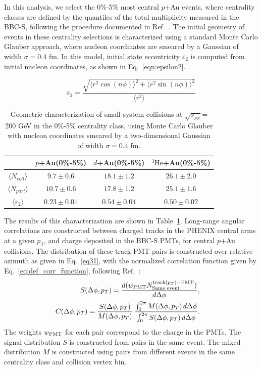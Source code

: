 \documentclass[%
reprint,
showpacs,preprintnumbers,
 amsmath,amssymb,
 aps,
]{revtex4-1}
\newcommand{\pt}{\mbox{$p_T$}\xspace}
\newcommand{\sqsn}{\mbox{$\sqrt{s_{_{NN}}}$}\xspace}
\newcommand{\dau}{\mbox{$d$+Au}\xspace}
\newcommand{\pau}{\mbox{$p$+Au}\xspace}
\newcommand{\hau}{\mbox{$^3\text{He}$+Au}\xspace}
\begin{document}
In this analysis, we select the 0\%-5\% most central \pau events, where 
centrality classes are defined by the quantiles of the total multiplicity measured in the BBC-S, following the procedure documented in Ref.~\cite{bbc}.
The initial geometry of events in these centrality selections is characterized using a standard Monte Carlo Glauber approach, where nucleon coordinates are smeared by a Gaussian of width $\sigma = 0.4$ fm. In this model, initial state eccentricity $\varepsilon_2$ is computed from initial nucleon coordinates, as shown in Eq.~\ref{eqn:epsilon2}. 

\begin{equation}
\label{eqn:epsilon2}
\varepsilon_2 = \frac{\sqrt{\langle r^2\cos (n\phi)\rangle ^2 + \langle r^2\sin (n\phi) \rangle ^2}}{\langle r^2 \rangle}
\end{equation}

\begin{table}
\caption{Geometric characterization of small system collisions at \sqsn = 200 GeV in the 0\%-5\% centrality class, using Monte Carlo Glauber with nucleon coordinates smeared by a two-dimensional Gaussian of width $\sigma=0.4$ fm.}
\begin{ruledtabular}
\begin{tabular}{c c c c}
\label{table_geometry}
 & \pau (0\%-5\%) & \dau (0\%-5\%) & \hau (0\%-5\%) \\
\hline
 $\langle N_{coll} \rangle$ & $9.7\pm 0.6$ & $18.1\pm 1.2$ & $26.1\pm 2.0$ \\
 $\langle N_{part} \rangle$ & $10.7\pm 0.6$ & $17.8\pm 1.2$ & $25.1\pm  1.6$ \\ 
 $\langle \varepsilon_2 \rangle$ & $0.23\pm 0.01$ & $0.54\pm 0.04$ & $0.50\pm 0.02$
\end{tabular}
\end{ruledtabular}
\end{table}

The results of this characterization are shown in Table~\ref{table_geometry}. Long-range angular correlations are constructed between charged tracks in the PHENIX central arms at a given \pt, and charge deposited in the BBC-S PMTs, for central \pau collisions. The distribution of these track-PMT pairs is constructed over relative azimuth as given in Eq.~\ref{eq31}, with the normalized correlation function given by Eq.~\ref{eq:def_corr_function}, following Ref.~\cite{PhysRevLett.115.142301}:
\begin{eqnarray}
  S(\Delta\phi,p_{T})=
  \frac{ d(w_{{\rm PMT}} N^{{\rm track}(p_{T}){\rm - PMT}}_{{\rm Same \; event}}) }{ d\Delta\phi}, & &
\label{eq31} \\
  C(\Delta\phi,p_{T}) =
          \frac{S(\Delta\phi,p_{T})}{M(\Delta\phi,p_{T})} \:
          \frac{\int_{0}^{2\pi} M(\Delta\phi,p_{T}) \, d\Delta\phi}{\int_{0}^{2\pi} S(\Delta\phi,p_{T}) \, d\Delta\phi}. & &
  \label{eq:def_corr_function}
\end{eqnarray}
The weights $w_{{\rm PMT}}$ for each pair correspond to the charge in the PMTs. The signal distribution $S$ is constructed from pairs in the same event. The mixed distribution $M$ is constructed using pairs from different events in the same centrality class and collision vertex bin.
\end{document}
